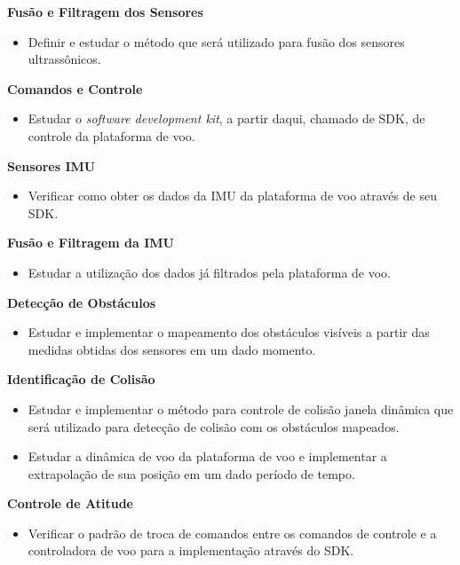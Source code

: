\documentclass[a4paper, 12pt]{article}
\begin{document}
\noindent\textbf{Fusão e Filtragem dos Sensores} 
\begin{itemize}
	\item
	Definir e estudar o método que será utilizado para fusão dos sensores ultrassônicos.
\end{itemize}

\noindent\textbf{Comandos e Controle} 
\begin{itemize}
	\item
	Estudar o \textit{software development kit}, a partir daqui, chamado de SDK, de controle da plataforma de voo.  
\end{itemize}

\noindent\textbf{Sensores IMU} 
\begin{itemize}
	\item
	Verificar como obter os dados da IMU da plataforma de voo através de seu SDK.
\end{itemize}

\noindent\textbf{Fusão e Filtragem da IMU} 
\begin{itemize}
	\item
	Estudar a utilização dos dados já filtrados pela plataforma de voo.  
\end{itemize}

\noindent\textbf{Detecção de Obstáculos} 
\begin{itemize}
	\item
	Estudar e implementar o mapeamento dos obstáculos visíveis a partir das medidas obtidas dos sensores em um dado momento.  
\end{itemize}

\noindent\textbf{Identificação de Colisão} 
\begin{itemize}
	\item
	Estudar e implementar o método para controle de colisão janela dinâmica que será utilizado para detecção de colisão com os obstáculos mapeados. 
	\item
	Estudar a dinâmica de voo da plataforma de voo e implementar a extrapolação de sua posição em um dado período de tempo.  
\end{itemize}

\noindent\textbf{Controle de Atitude} 
\begin{itemize}
	\item
	Verificar o padrão de troca de comandos entre os comandos de controle e a controladora de voo para a implementação através do SDK.  
\end{itemize}
\end{document}
